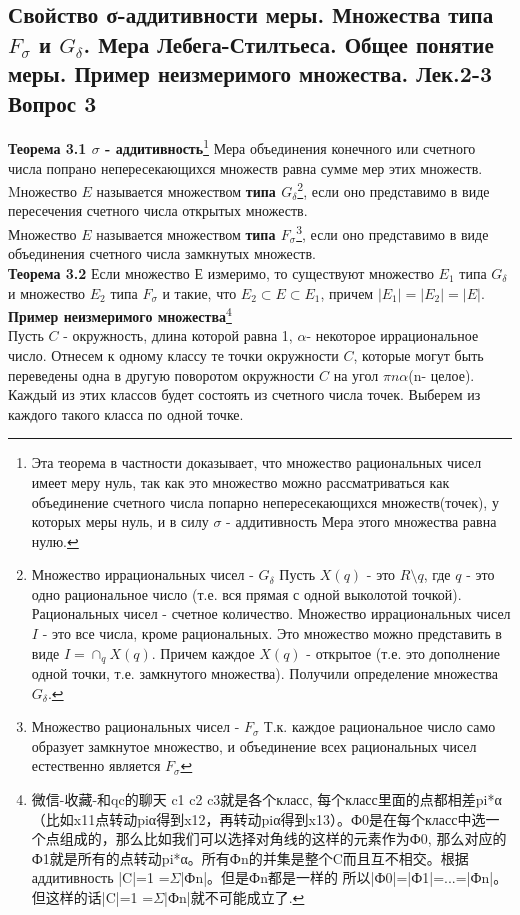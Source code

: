 \documentclass{article}
\begin{document}
\subsection{Свойство σ-аддитивности меры. Множества типа $F_{\sigma}$ и $G_{\delta}$. Мера Лебега-Стилтьеса. Общее понятие меры. Пример неизмеримого множества. Лек.2-3 \textbf{Вопрос 3}}
	\textbf{Теорема 3.1 $\sigma$ - аддитивность}\footnote{Эта теорема в частности доказывает, что множество рациональных чисел имеет меру нуль, так как это множество можно рассматриваться как объединение счетного числа попарно непересекающихся множеств(точек), у которых меры нуль, и в силу $\sigma$ - аддитивность Мера этого множества равна нулю.} Мера объединения конечного или счетного числа попрано непересекающихся множеств равна сумме мер этих множеств.\\
	Mножество $E$ называется множеством \textbf{типа $G_{\delta}$}\footnote{Множество иррациональных чисел - $G_{\delta}$ Пусть $X(q)$ - это $R \setminus {q}$, где $q$ - это одно рациональное число (т.е. вся прямая с одной выколотой точкой).  Рациональных чисел - счетное количество. Множество иррациональных чисел $I$ - это все числа, кроме рациональных. Это множество можно представить в виде $I = \cap_{q} X(q)$. Причем каждое $X(q)$ - открытое (т.е. это дополнение одной точки, т.е. замкнутого множества). Получили определение множества ${G}_{\delta}$.},  если оно представимо в виде пересечения счетного числа открытых множеств. \\
	Множество $E$ называется множеством \textbf{типа $F_{\sigma}$}\footnote{Множество рациональных чисел - $F_{\sigma}$ Т.к. каждое рациональное число само образует замкнутое множество, и объединение всех рациональных чисел естественно является $F_{\sigma}$},  если оно представимо в виде объединения счетного числа замкнутых множеств.\\
	\textbf{Теорема 3.2} Если множество Е измеримо, то существуют множество ${E}_{1}$ типа $G_{\delta}$ и множество ${E}_{2}$ типа $F_{\sigma}$ и такие, что ${E}_{2}\subset{E}\subset{E}_{1}$, причем $|{E}_{1}|=|{E}_{2}|=|E|$.\\
	\textbf{Пример неизмеримого множества}\footnote{微信-收藏-和qc的聊天 c1 c2 c3就是各个класс, 每个класс里面的点都相差pi*α（比如x11点转动piα得到x12，再转动piα得到x13）。Ф0是在每个класс中选一个点组成的，那么比如我们可以选择对角线的这样的元素作为Ф0, 那么对应的Ф1就是所有的点转动pi*α。所有Фn的并集是整个C而且互不相交。根据аддитивность |C|=1 =$\Sigma$|Фn|。但是Фn都是一样的 所以|Ф0|=|Ф1|=...=|Фn|。但这样的话|C|=1 =$\Sigma$|Фn|就不可能成立了.}\\
	Пусть $C$ - окружность, длина которой равна 1, $\alpha$-  некоторое иррациональное число. Отнесем к одному классу те точки окружности $C$,  которые могут быть переведены одна в другую поворотом окружности $C$ на угол  $\pi n\alpha $(n-  целое). Каждый из этих классов будет состоять из счетного числа точек. Выберем из каждого такого класса по одной точке. 
	
\end{document}
